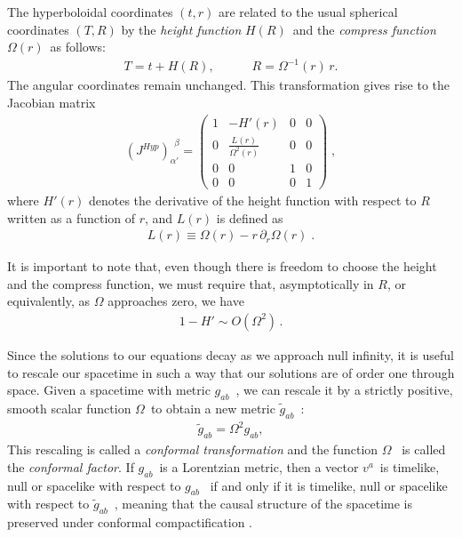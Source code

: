 The hyperboloidal coordinates $(t, r)$ are related to the usual spherical coordinates $(T, R)$ by the \textit{height function} $H(R)$~and the \textit{compress function} $\Omega(r)$~as follows:
%
\begin{align}
 T = t + H(R), 
     \quad \quad \quad R = \Omega^{-1}(r) \, r.
\end{align}
%
The angular coordinates remain unchanged. This transformation gives rise to the Jacobian matrix
%
\begin{align}
    \left(J^{Hyp}\right)_{\alpha'}^{\ \ \beta} = 
    \begin{pmatrix}
        1 & -H'(r) & 0 & 0 \\
        0 & \frac{L(r)}{\Omega^2(r)} & 0 & 0 \\
        0 & 0 & 1 & 0 \\
        0 & 0 & 0 & 1
    \end{pmatrix} \; ,
\end{align}
%
where $H'(r)$ denotes the derivative of the height function with respect to $R$ written as a function of $r$, and $L(r)$ is defined as
%
\begin{align}
 L(r) \equiv \Omega(r) - r \, \partial_r \Omega(r) \; .
\end{align}

It is important to note that, even though there is freedom to choose the height and the compress function, we must require that, asymptotically in $R$, or equivalently, as $\Omega$ approaches zero, we have
%
\begin{align}
    1 - H' \sim O(\Omega^2) \, .
\end{align}

Since the solutions to our equations decay as we approach null infinity, it is useful to rescale our spacetime in such a way that our solutions are of order one through space. Given a spacetime with metric $g_{ab}$~, we can rescale it by a strictly positive, smooth scalar function $\Omega$~to obtain a new metric $\tilde{g}_{ab}$~:
%
\begin{align}
    \tilde{g}_{ab} = \Omega^2 g_{ab},
\end{align}
%
This rescaling is called a \textit{conformal transformation} and the function $\Omega$~ is called the \textit{conformal factor}. If $g_{ab}$~is a Lorentzian metric, then a vector $v^a$~is timelike, null or spacelike with respect to $g_{ab}$~ if and only if it is timelike, null or spacelike with respect to $\tilde{g}_{ab}$~, meaning that the causal structure of the spacetime is preserved under conformal compactification \cite{wald:1984}. 

